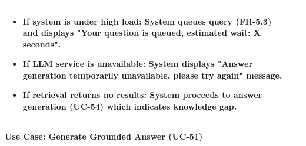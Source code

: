 \begin{minipage}{\textwidth}
\begin{tabularx}{\textwidth}{|p{}|X|}
{\begin{itemize}
            \item If system is under high load: System queues query (FR-5.3) and displays "Your question is queued, estimated wait: X seconds".
            \item If LLM service is unavailable: System displays "Answer generation temporarily unavailable, please try again" message.
            \item If retrieval returns no results: System proceeds to answer generation (UC-54) which indicates knowledge gap.
        \end{itemize}%
        } \\
    \hline
\end{tabularx}
\end{minipage}
\bigskip

\begin{minipage}{\textwidth}
\begin{center}
    \textbf{Use Case: Generate Grounded Answer (UC-51)}
\end{center}
\vspace{0.5ex}
\small


\end{minipage}
